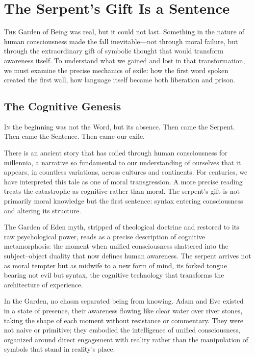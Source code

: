 \chapter{The Serpent's Gift Is a Sentence}

\lettrine{T}{he} Garden of Being was real, but it could not last. Something in the nature of human consciousness made the fall inevitable—not through moral failure, but through the extraordinary gift of symbolic thought that would transform awareness itself. To understand what we gained and lost in that transformation, we must examine the precise mechanics of exile: how the first word spoken created the first wall, how language itself became both liberation and prison.

\section{The Cognitive Genesis}

\lettrine{I}{n} the beginning was not the Word, but its absence.
Then came the Serpent.
Then came the Sentence.
Then came our exile.

There is an ancient story that has coiled through human consciousness for millennia, a narrative so fundamental to our understanding of ourselves that it appears, in countless variations, across cultures and continents. For centuries, we have interpreted this tale as one of moral transgression. A more precise reading treats the catastrophe as cognitive rather than moral. The serpent's gift is not primarily moral knowledge but the first sentence: syntax entering consciousness and altering its structure.

The Garden of Eden myth, stripped of theological doctrine and restored to its raw psychological power, reads as a precise description of cognitive metamorphosis: the moment when unified consciousness shattered into the subject–object duality that now defines human awareness. The serpent arrives not as moral tempter but as midwife to a new form of mind, its forked tongue bearing not evil but syntax, the cognitive technology that transforms the architecture of experience.

In the Garden, no chasm separated being from knowing. Adam and Eve existed in a state of presence, their awareness flowing like clear water over river stones, taking the shape of each moment without resistance or commentary. They were not naive or primitive; they embodied the intelligence of unified consciousness, organized around direct engagement with reality rather than the manipulation of symbols that stand in reality's place.

